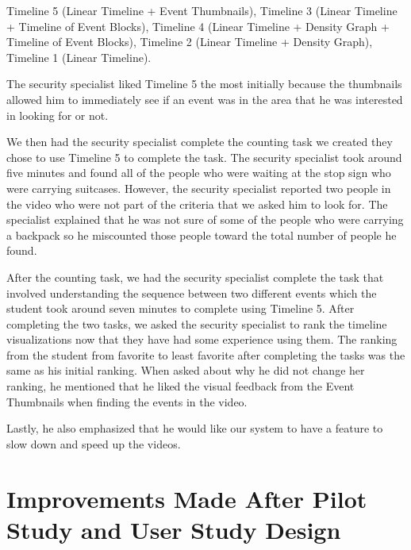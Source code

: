 \documentclass[doublespace,draft,nopageskip]{VTthesis} %
\begin{document}
Timeline 5 (Linear Timeline + Event Thumbnails), Timeline 3 (Linear Timeline + Timeline of Event Blocks), Timeline 4 (Linear Timeline + Density Graph + Timeline of Event Blocks), Timeline 2 (Linear Timeline + Density Graph), Timeline 1 (Linear Timeline). 

The security specialist liked Timeline 5 the most initially because the thumbnails allowed him to immediately see if an event was in the area that he was interested in looking for or not. 

We then had the security specialist complete the counting task we created they chose to use Timeline 5 to complete the task. The security specialist took around five minutes and found all of the people who were waiting at the stop sign who were carrying suitcases. However, the security specialist reported two people in the video who were not part of the criteria that we asked him to look for. The specialist explained that he was not sure of some of the people who were carrying a backpack so he miscounted those people toward the total number of people he found.

After the counting task, we had the security specialist complete the task that involved understanding the sequence between two different events which the student took around seven minutes to complete using Timeline 5. After completing the two tasks, we asked the security specialist to rank the timeline visualizations now that they have had some experience using them. The ranking from the student from favorite to least favorite after completing the tasks was the same as his initial ranking. When asked about why he did not change her ranking, he mentioned that he liked the visual feedback from the Event Thumbnails when finding the events in the video.

Lastly, he also emphasized that he would like our system to have a feature to slow down and speed up the videos.

\chapter{Improvements Made After Pilot Study and User Study Design} \label{ch:methods}
\end{document}
